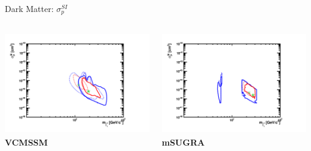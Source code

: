 \documentclass{beamer}
\begin{document}
\begin{frame}{Dark Matter: $\sigma_{p}^{SI}$}
  \begin{columns}
    \begin{column}{0.5\textwidth}
      \includegraphics[height=4.5cm]{ssd/vcmssm.pdf}\\ 
      \textbf{VCMSSM}
    \end{column}
    \begin{column}{0.5\textwidth}
      \includegraphics[height=4.5cm]{ssd/msugra.pdf}\\
      \textbf{mSUGRA}
    \end{column}
  \end{columns}
\end{frame}
\end{document}
